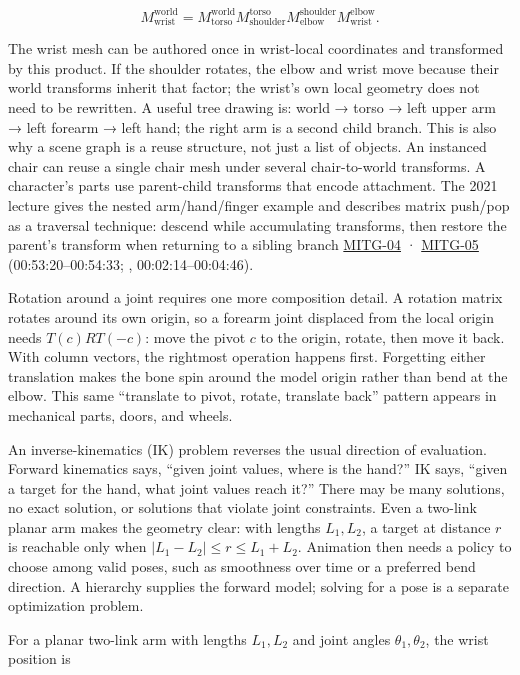 \[
M_{\mathrm{wrist}}^{\mathrm{world}}=
M_{\mathrm{torso}}^{\mathrm{world}}
M_{\mathrm{shoulder}}^{\mathrm{torso}}
M_{\mathrm{elbow}}^{\mathrm{shoulder}}
M_{\mathrm{wrist}}^{\mathrm{elbow}}.
\]

The wrist mesh can be authored once in wrist-local coordinates and transformed by this product. If the shoulder rotates, the elbow and wrist move because their world transforms inherit that factor; the wrist's own local geometry does not need to be rewritten. A useful tree drawing is: world → torso → left upper arm → left forearm → left hand; the right arm is a second child branch. This is also why a scene graph is a reuse structure, not just a list of objects. An instanced chair can reuse a single chair mesh under several chair-to-world transforms. A character's parts use parent-child transforms that encode attachment. The 2021 lecture gives the nested arm/hand/finger example and describes matrix push/pop as a traversal technique: descend while accumulating transforms, then restore the parent's transform when returning to a sibling branch \hyperref[04-visual-computing-ii-ch036]{MITG-04} · \hyperref[04-visual-computing-ii-ch036]{MITG-05} (00:53:20--00:54:33; , 00:02:14--00:04:46).

Rotation around a joint requires one more composition detail. A rotation matrix rotates around its own origin, so a forearm joint displaced from the local origin needs \(T(c)RT(-c)\): move the pivot \(c\) to the origin, rotate, then move it back. With column vectors, the rightmost operation happens first. Forgetting either translation makes the bone spin around the model origin rather than bend at the elbow. This same ``translate to pivot, rotate, translate back'' pattern appears in mechanical parts, doors, and wheels.

An inverse-kinematics (IK) problem reverses the usual direction of evaluation. Forward kinematics says, ``given joint values, where is the hand?'' IK says, ``given a target for the hand, what joint values reach it?'' There may be many solutions, no exact solution, or solutions that violate joint constraints. Even a two-link planar arm makes the geometry clear: with lengths \(L_1,L_2\), a target at distance \(r\) is reachable only when \(|L_1-L_2|\le r\le L_1+L_2\). Animation then needs a policy to choose among valid poses, such as smoothness over time or a preferred bend direction. A hierarchy supplies the forward model; solving for a pose is a separate optimization problem.

For a planar two-link arm with lengths \(L_1,L_2\) and joint angles \(\theta_1,\theta_2\), the wrist position is

